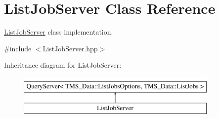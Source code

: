 \hypertarget{classListJobServer}{
\section{ListJobServer Class Reference}
\label{classListJobServer}
}


\hyperlink{classListJobServer}{ListJobServer} class implementation.  




{\ttfamily \#include $<$ListJobServer.hpp$>$}

Inheritance diagram for ListJobServer:\begin{figure}[H]
\begin{center}
\leavevmode
\includegraphics[height=2.000000cm]{classListJobServer}
\end{center}
\end{figure}

